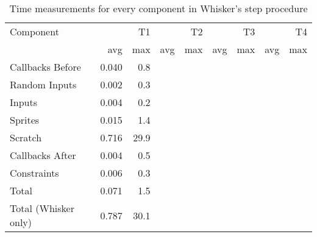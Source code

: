 \begin{table}[htpb]
    \centering
    \small
    \begin{tabular}{l|rr|rr|rr|rr}
        \toprule
        Component            &       & T1   &       & T2   &        & T3   &       & T4   \\
                             & avg   & max  & avg   & max  & avg    & max  & avg   & max  \\
        \midrule
        Callbacks Before     & 0.040 &  0.8 &       &      &        &      &       &      \\
        Random Inputs        & 0.002 &  0.3 &       &      &        &      &       &      \\
        Inputs               & 0.004 &  0.2 &       &      &        &      &       &      \\
        Sprites              & 0.015 &  1.4 &       &      &        &      &       &      \\
        Scratch              & 0.716 & 29.9 &       &      &        &      &       &      \\
        Callbacks After      & 0.004 &  0.5 &       &      &        &      &       &      \\
        Constraints          & 0.006 &  0.3 &       &      &        &      &       &      \\
        \midrule
        Total                & 0.071 &  1.5 &       &      &        &      &       &      \\
        Total (Whisker only) & 0.787 & 30.1 &       &      &        &      &       &      \\
        \bottomrule
    \end{tabular}
    \caption{Time measurements for every component in Whisker's step procedure}
    \label{tab:component_time_measurements}
\end{table}
